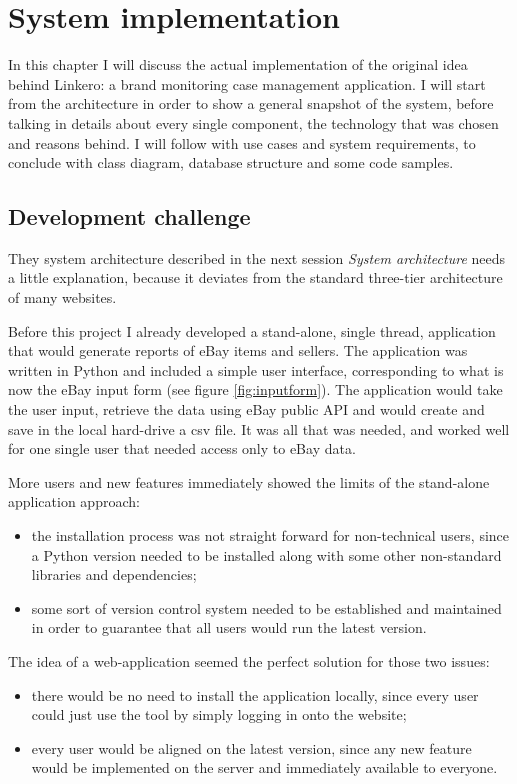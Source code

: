 \chapter{System implementation}

In this chapter I will discuss the actual implementation of the original idea
behind Linkero: a brand monitoring case management application. I will start
from the architecture in order to show a general snapshot of the system, before
talking in details about every single component, the technology that was
chosen and reasons behind. I will follow with use cases and
system requirements, to conclude with class diagram, database structure and some
code samples.

\section{Development challenge}
They system architecture described in the next session \emph{System
architecture} needs a little explanation, because it deviates from the standard
three-tier architecture of many websites.

Before this project I already developed a stand-alone, single thread,
application that would generate reports of eBay items and sellers. The
application was written in Python and included a simple user interface,
corresponding to what is now the eBay input form (see figure
\ref{fig:inputform}). The application would take the user input, retrieve the
data using eBay public API and would create and save in the local hard-drive a
csv file. It was all that was needed, and worked well for one single user that
needed access only to eBay data.

More users and new features immediately showed the limits of the stand-alone
application approach:
\begin{itemize}
  \item the installation process was not straight forward for non-technical
  users, since a Python version needed to be installed along with some other
  non-standard libraries and dependencies;
  \item some sort of version control system needed to be established and
  maintained in order to guarantee that all users would run the latest version.
\end{itemize}

The idea of a web-application seemed the perfect solution for those two issues:
\begin{itemize}
  \item there would be no need to install the application locally, since every
  user could just use the tool by simply logging in onto the website;
  \item every user would be aligned on the latest version, since any new
  feature would be implemented on the server and immediately available to
  everyone.
\end{itemize}

